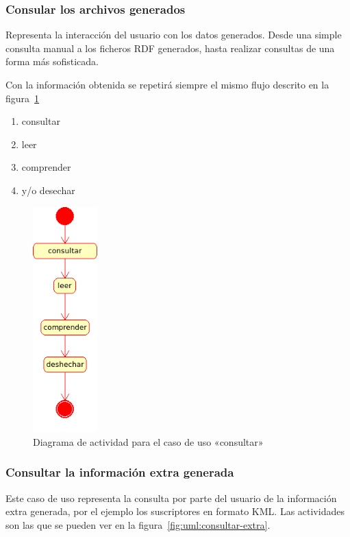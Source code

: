 \subsubsection{Consular los archivos generados}

Representa la interacción del usuario con los datos generados. Desde una 
simple consulta manual a los ficheros RDF generados, hasta realizar 
consultas de una forma más sofisticada.

Con la información obtenida se repetirá siempre el mismo flujo descrito en
la figura~\ref{fig:uml:consultar}

\begin{enumerate}
 \item consultar
 \item leer
 \item comprender
 \item y/o desechar
\end{enumerate}

\begin{figure}[H]
 	\centering
	\includegraphics[width=2.5cm]{images/uml/casos-uso/consultar.png}
	\caption{Diagrama de actividad para el caso de uso «consultar»}
	\label{fig:uml:consultar}
\end{figure}

\subsubsection{Consultar la información extra generada}

Este caso de uso representa la consulta por parte del usuario de la 
información extra generada, por el ejemplo los suscriptores en formato 
KML. Las actividades son las que se pueden ver en la 
figura~\ref{fig:uml:consultar-extra}.

